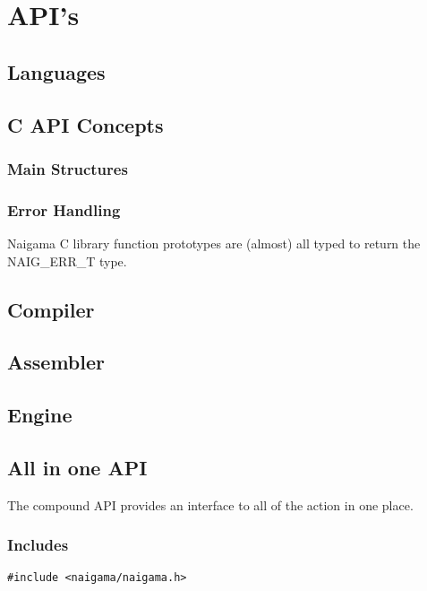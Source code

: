 \section{API's}

\subsection{Languages}

\subsection{C API Concepts}

\subsubsection{Main Structures}

\subsubsection{Error Handling}

Naigama C library function prototypes are (almost) all typed to return
the NAIG\_ERR\_T type.

\subsection{Compiler}

\subsection{Assembler}

\subsection{Engine}

\subsection{All in one API}

The compound API provides an interface to all of the action in one place.

\subsubsection{Includes}

\begin{myquote}
\begin{verbatim}
#include <naigama/naigama.h>
\end{verbatim}
\end{myquote}

